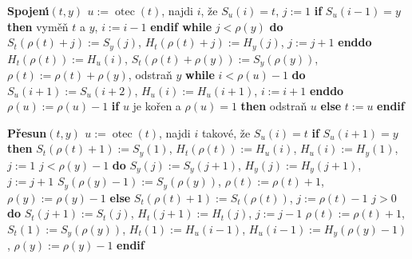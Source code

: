 \documentclass[a4paper,12pt]{article}
\DeclareMathOperator*{\otec}{otec}
\begin{document}
{\bf Spojen\'\i$(t,y)$\newline 
$u:=\otec(t)$}, najdi $i$, \v ze $S_u(i)=t$, $j:=1$\newline 
{\bf if} $S_u(i-1)=y$ {\bf then} vym\v e\v n $t$ a $y$, $i:=i-1$ {\bf endif\newline 
while} $j<\rho (y)$ {\bf do}\newline 
\phantom{---}$S_t(\rho (t)+j):=S_y(j)$, $H_t(\rho (t)+j):=H_y(j)$, $j:=j+1$\newline 
{\bf enddo}\newline 
$H_t(\rho (t)):=H_u(i)$, $S_t(\rho (t)+\rho (y)):=S_y(\rho (y))$, $
\rho (t):=\rho (t)+\rho (y)$, odstra\v n $y$\newline 
{\bf while} $i<\rho (u)-1$ {\bf do}\newline 
\phantom{---}$S_u(i+1):=S_u(i+2)$, $H_u(i):=H_u(i+1)$, $i:=i+1$\newline 
{\bf enddo}\newline 
$\rho (u):=\rho (u)-1$\newline 
{\bf if} $u$ je ko\v ren a $\rho (u)=1$ {\bf then}\newline 
\phantom{---}odstra\v n $u$\newline 
{\bf else}\newline 
\phantom{---}$t:=u$\newline 
{\bf endif}
\medskip

{\bf P\v resun$(t,y)$\newline 
$u:=\otec(t)$}, najdi $i$ takov\'e, \v ze $S_u(i)=t$\newline 
{\bf if} $S_u(i+1)=y$ {\bf then}\newline 
\phantom{---}$S_t(\rho (t)+1):=S_y(1)$, $H_t(\rho (t)):=H_u(i)$,\newline 
\phantom{---}$H_u(i):=H_y(1)$, $j:=1$\newline 
\phantom{---}{\bf while} $j<\rho (y)-1$ {\bf do}\newline 
\phantom{------}$S_y(j):=S_y(j+1)$, $H_y(j):=H_y(j+1)$, $j:=j+1$\newline 
\phantom{---}{\bf enddo}\newline 
\phantom{---}$S_y(\rho (y)-1):=S_y(\rho (y))$, $\rho (t):=\rho (t)+1$, $\rho 
(y):=\rho (y)-1$\newline 
{\bf else}\newline
\phantom{---}$S_t(\rho (t)+1):=S_t(\rho (t))$, $j:=\rho (t)-1$\newline 
\phantom{---}{\bf while} $j>0$ {\bf do}\newline 
\phantom{------}$S_t(j+1):=S_t(j)$, $H_t(j+1):=H_t(j)$, $j:=j-1$\newline 
\phantom{---}{\bf enddo}\newline 
\phantom{---}$\rho (t):=\rho (t)+1$, $S_t(1):=S_y(\rho (y))$, $H_t(1):=H_u(i-
1)$,\newline 
\phantom{---}$H_u(i-1):=H_y(\rho (y)-1)$, $\rho (y):=\rho (y)-1$\newline 
{\bf endif}
\medskip
\end{document}
